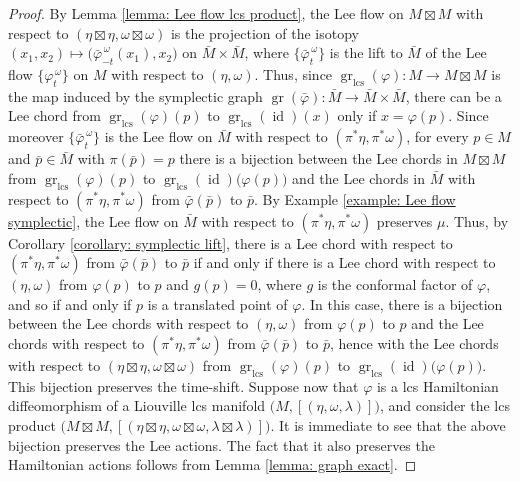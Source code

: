 \documentclass{amsart}
\DeclareMathOperator{\gr}{gr}
\DeclareMathOperator{\lcs}{lcs}
\DeclareMathOperator{\id}{id}
\theoremstyle{remark}
\begin{document}
\begin{proof}
By Lemma \ref{lemma: Lee flow lcs product},
the Lee flow on $M \boxtimes M$
with respect to $(\eta \boxtimes \eta, \omega \boxtimes \omega)$
is the projection of the isotopy
$(x_1, x_2) \mapsto
\big( \bar{\varphi}^{\, \omega}_{-t} (x_1), x_2 \big)$
on $\bar{M} \times \bar{M}$,
where $\{\bar{\varphi}^{\, \omega}_t\}$ is the lift to $\bar{M}$
of the Lee flow $\{\varphi^{\, \omega}_t\}$ on $M$
with respect to $(\eta, \omega)$. Thus,
since $\gr_{\lcs} (\varphi): M \rightarrow M \boxtimes M$
is the map induced by the symplectic graph
$\gr (\bar{\varphi}): \bar{M} \rightarrow \bar{M} \times \bar{M}$,
there can be a Lee chord
from $\gr_{\lcs} (\varphi) (p)$ to $\gr_{\lcs} (\id) (x)$
only if $x = \varphi(p)$.
Since moreover $\{\bar{\varphi}^{\, \omega}_t\}$
is the Lee flow on $\bar{M}$
with respect to $(\pi^{\ast}\eta, \pi^{\ast}\omega)$,
for every $p \in M$ and $\bar{p} \in \bar{M}$
with $\pi (\bar{p}) = p$
there is a bijection between the Lee chords in $M \boxtimes M$
from $\gr_{\lcs} (\varphi) (p)$ to $\gr_{\lcs} (\id) \big(\varphi(p)\big)$
and the Lee chords in $\bar{M}$
with respect to $(\pi^{\ast}\eta, \pi^{\ast}\omega)$
from $\bar{\varphi} (\bar{p})$ to $\bar{p}$.
By Example \ref{example: Lee flow symplectic},
the Lee flow on $\bar{M}$
with respect to $(\pi^{\ast}\eta, \pi^{\ast}\omega)$
preserves $\mu$.
Thus, by Corollary \ref{corollary: symplectic lift},
there is a Lee chord with respect to $(\pi^{\ast}\eta, \pi^{\ast}\omega)$
from $\bar{\varphi} (\bar{p})$ to $\bar{p}$
if and only if there is a Lee chord with respect to $(\eta, \omega)$
from $\varphi (p)$ to $p$ and $g(p) = 0$,
where $g$ is the conformal factor of $\varphi$,
and so if and only if $p$ is a translated point of $\varphi$.
In this case,
there is a bijection between the Lee chords
with respect to $(\eta, \omega)$
from $\varphi (p)$ to $p$
and the Lee chords with respect to $(\pi^{\ast}\eta, \pi^{\ast}\omega)$
from $\bar{\varphi} (\bar{p})$ to $\bar{p}$,
hence with the Lee chords
with respect to $(\eta \boxtimes \eta, \omega \boxtimes \omega)$
from $\gr_{\lcs} (\varphi) (p)$ to $\gr_{\lcs} (\id) \big(\varphi(p)\big)$.
This bijection preserves the time-shift.
Suppose now that $\varphi$ is a lcs Hamiltonian diffeomorphism
of a Liouville lcs manifold $\big( M, [(\eta, \omega, \lambda)] \big)$,
and consider the lcs product $\big( M \boxtimes M,
[(\eta \boxtimes \eta, \omega \boxtimes \omega, \lambda \boxtimes \lambda)] \big)$.
It is immediate to see that the above bijection preserves the Lee actions.
The fact that it also preserves the Hamiltonian actions
follows from Lemma \ref{lemma: graph exact}.


\end{proof}
\end{document}
